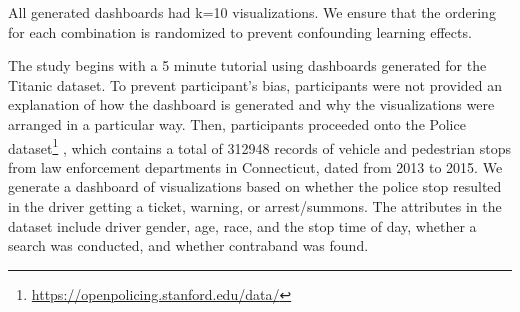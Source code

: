All generated dashboards had k=10 visualizations. We ensure that the ordering for each combination is randomized to prevent confounding learning effects. 
\par The study begins with a 5 minute tutorial using dashboards generated for the Titanic dataset. To prevent participant's bias, participants were not provided an explanation of how the dashboard is generated and why the visualizations were arranged in a particular way. Then, participants proceeded onto the Police dataset\footnote{\url{https://openpolicing.stanford.edu/data/}} %
, which contains a total of 312948 records of vehicle and pedestrian stops from law enforcement departments in Connecticut, dated from 2013 to 2015. We generate a dashboard of visualizations based on whether the police stop resulted in the driver getting a ticket, warning, or arrest/summons. The attributes in the dataset include driver gender, age, race, and the stop time of day, whether a search was conducted, and whether contraband was found.

